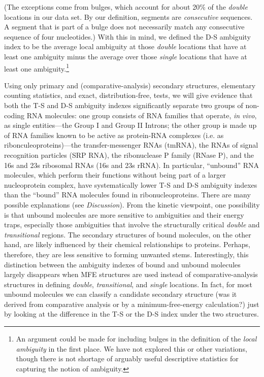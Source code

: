 \documentclass[10pt,letterpaper]{article}
\begin{document}
(The exceptions come from bulges, which account for about 20\% of the {\em double} locations in our data set.
By our definition, segments are {\em consecutive} sequences. A segment that is part of a bulge does not necessarily match any consecutive sequence of four nucleotides.)
With this in mind, we defined the D-S ambiguity index to be the average local ambiguity at those {\em double} locations that have at least one ambiguity minus the average over those {\em single} locations that have at least one ambiguity.\footnote{
An argument could be made for including bulges in the definition of the {\em local ambiguity} in the first place. We have not explored this or other variations, though there is not shortage of arguably useful descriptive statistics for capturing the notion of ambiguity.}

Using only primary and (comparative-analysis) secondary structures, elementary counting statistics, 
and exact, distribution-free, tests,
we will give evidence that
both the T-S and D-S ambiguity indexes 
significantly separate two groups of non-coding RNA molecules: one group consists of  RNA families that operate, {\em in vivo}, as single entities---the Group I and Group II Introns;
the other group is made up of RNA families  known to be active as protein-RNA complexes (i.e. as ribonculeoproteins)---the transfer-messenger RNAs (tmRNA), the RNAs of signal recognition particles (SRP RNA), the ribonuclease P family (RNase P), and the 16s and 23s ribosomal RNAs (16s and 23s rRNA). In particular, ``unbound'' RNA molecules, which perform their functions without being part of a larger nucleoprotein complex, have systematically lower T-S and D-S ambiguity indexes than the ``bound'' RNA molecules found in ribonucleoproteins. 
There are many possible explanations (see {\em Discussion}). From the kinetic viewpoint, one possibility is that unbound molecules are more sensitive to ambiguities and their energy traps, especially those ambiguities that involve the structurally critical {\em double} and {\em transitional} regions. The secondary structures of bound molecules, on the other hand, are likely influenced by their chemical relationships to proteins. Perhaps, therefore, they are less sensitive to forming unwanted stems. Interestingly, this distinction between the ambiguity indexes of bound and unbound molecules largely disappears when MFE structures are used instead of comparative-analysis structures in defining {\em double}, {\em transitional}, and {\em single} locations. In fact, for most unbound molecules we can classify a candidate secondary
structure (was it derived from comparative analysis or by a minimum-free-energy calculation?) just by looking at the difference in the T-S or the D-S index under the two structures.
\end{document}
